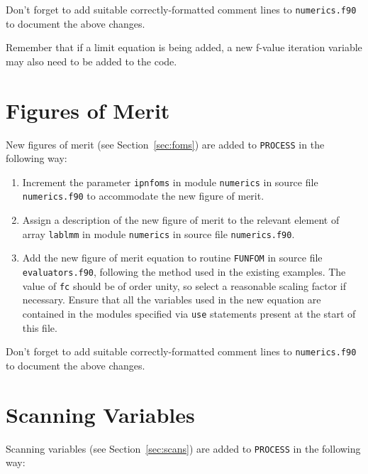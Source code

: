 \documentclass[11pt,a4paper]{report}
\newcommand{\process}{\mbox{\texttt{PROCESS}}}
\begin{document}
Don't forget to add suitable correctly-formatted comment lines to
\texttt{numerics.f90} to document the above changes.

Remember that if a limit equation is being added, a new f-value iteration
variable may also need to be added to the code.

\section{Figures of Merit}

New figures of merit (see Section~\ref{sec:foms}) are added to \process\/ in
the following way:

\begin{enumerate}

\item Increment the parameter \texttt{ipnfoms} in module \texttt{numerics} in
  source file \texttt{numerics.f90} to accommodate the new figure of merit.

\item Assign a description of the new figure of merit to the relevant element
  of array \texttt{lablmm} in module \texttt{numerics} in source file
  \texttt{numerics.f90}.

\item Add the new figure of merit equation to routine \texttt{FUNFOM} in
  source file \texttt{evaluators.f90}, following the method used in the
  existing examples. The value of \texttt{fc} should be of order unity, so
  select a reasonable scaling factor if necessary. Ensure that all the
  variables used in the new equation are contained in the modules specified
  via \texttt{use} statements present at the start of this file.

\end{enumerate}

Don't forget to add suitable correctly-formatted comment lines to
\texttt{numerics.f90} to document the above changes.

\section{Scanning Variables}

Scanning variables (see Section~\ref{sec:scans}) are added to \process\/ in
the following way:
\end{document}
